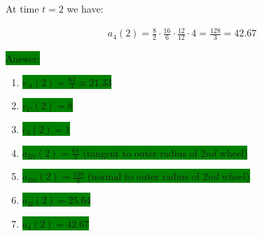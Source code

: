 \documentclass{article}
\begin{document}
At time $t = 2$ we have:

\begin{align}
    a_{4}(2) = \frac{8}{2} \cdot \frac{16}{6} \cdot \frac{12}{12} \cdot 4 = \frac{128}{3} = 42.67
\end{align}

\colorbox{green}{Answer:}

\begin{enumerate}
    \item \colorbox{green}{$v_A(2) = \frac{64}{3} \approx 21.33$}
    \item \colorbox{green}{$v_C(2) = 8$}
    \item \colorbox{green}{$\epsilon_3(2) = 1$ }
    \item \colorbox{green}{$a_{B\tau}(2) = \frac{64}{3}$ (tangent to outer radius of $2nd$ wheel)}
    \item \colorbox{green}{$a_{Bn}(2) = \frac{128}{9}$ (normal to outer radius of $2nd$ wheel)}
    \item \colorbox{green}{$a_{B}(2) = 25.64$}
    \item \colorbox{green}{$a_{4}(2) = 42.67$}
\end{enumerate}
\end{document}
